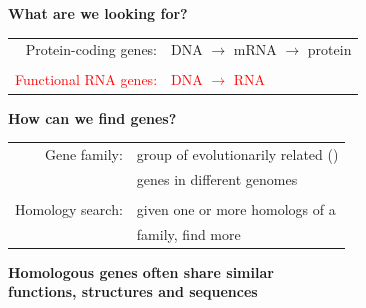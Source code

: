 \documentclass[landscape]{slides}
\begin{document}
\begin{slide}
\begin{center}
\textbf{What are we looking for?}
\end{center}
\medskip

\begin{center}
\begin{tabular}{rl}
Protein-coding genes: & DNA $\rightarrow$ mRNA $\rightarrow$ protein \\
& \\
\textcolor{red}{Functional RNA genes:} & \textcolor{red}{DNA $\rightarrow$ RNA}
\end{tabular}
\medskip

\medskip

\medskip

\medskip

\medskip

\textbf{How can we find genes?}

\begin{tabular}{rl}
Gene family: & group of evolutionarily related ({\color{red}{\em homologous}}) \\
& genes in different genomes \\
& \\
Homology search: & given one or more homologs of a \\
& family, find more \\
\end{tabular}


{\bf Homologous genes often share similar \\ functions, structures and
  sequences}

\end{center}

\vfill
\end{slide}
\end{document}
